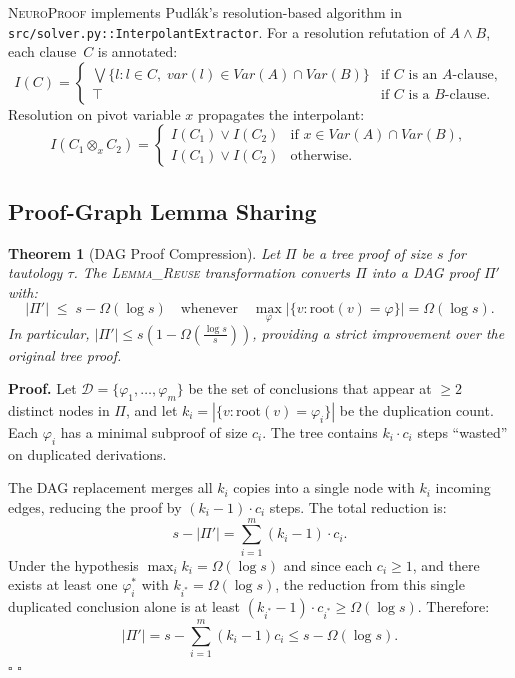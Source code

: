 \documentclass[conference]{IEEEtran}
\newtheorem{theorem}{Theorem}[section]
\newenvironment{proof}[1][Proof]{\textbf{#1.} }{\hfill$\square$}
\newcommand{\dlor}{\mathbin{\vee}}
\newcommand{\dltop}{\top}
\newcommand{\NP}{\textsc{NeuroProof}}
\begin{document}
\NP{} implements Pudl\'{a}k's resolution-based algorithm in
\texttt{src/solver.py::InterpolantExtractor}.  For a resolution
refutation of $A \wedge B$, each clause~$C$ is annotated:
\begin{equation}
  I(C) = \begin{cases}
    \bigvee\{l : l \in C,\;
      \mathit{var}(l) \in \mathit{Var}(A) \cap \mathit{Var}(B)\}
      & \text{if } C \text{ is an $A$-clause}, \\
    \dltop & \text{if } C \text{ is a $B$-clause}.
  \end{cases}
\end{equation}
Resolution on pivot variable $x$ propagates the interpolant:
\begin{equation}
  I(C_1 \otimes_x C_2) =
  \begin{cases}
    I(C_1) \dlor I(C_2)
      & \text{if } x \in \mathit{Var}(A) \cap \mathit{Var}(B), \\
    I(C_1) \dlor I(C_2)
      & \text{otherwise}.
  \end{cases}
\end{equation}

\subsection{Proof-Graph Lemma Sharing}

\begin{theorem}[DAG Proof Compression]
  \label{thm:proof-size}
  Let $\Pi$ be a tree proof of size $s$ for tautology $\tau$.
  The \textsc{Lemma\_Reuse} transformation converts $\Pi$ into a
  DAG proof $\Pi'$ with:
  \begin{equation}
    |\Pi'| \;\leq\;
    s - \Omega(\log s)
    \quad\text{whenever}\quad
    \max_{\varphi} |\{v : \mathrm{root}(v) = \varphi\}|
    = \Omega(\log s).
  \end{equation}
  In particular, $|\Pi'| \leq s(1 - \Omega(\tfrac{\log s}{s}))$,
  providing a \emph{strict} improvement over the original tree proof.
\end{theorem}
\begin{proof}
  Let $\mathcal{D} = \{\varphi_1, \ldots, \varphi_m\}$ be the set
  of conclusions that appear at $\geq 2$ distinct nodes in $\Pi$,
  and let $k_i = |\{v : \mathrm{root}(v) = \varphi_i\}|$ be the
  duplication count.  Each $\varphi_i$ has a minimal subproof of
  size $c_i$.  The tree contains $k_i \cdot c_i$ steps
  ``wasted'' on duplicated derivations.

  The DAG replacement merges all $k_i$ copies into a single node with
  $k_i$ incoming edges, reducing the proof by $(k_i - 1) \cdot c_i$
  steps.  The total reduction is:
  \[
    s - |\Pi'| = \sum_{i=1}^{m} (k_i - 1) \cdot c_i.
  \]
  Under the hypothesis $\max_i k_i = \Omega(\log s)$ and since each
  $c_i \geq 1$, and there exists at least one $\varphi_i^*$ with
  $k_{i^*} = \Omega(\log s)$, the reduction from this single
  duplicated conclusion alone is at least
  $(k_{i^*} - 1) \cdot c_{i^*} \geq \Omega(\log s)$.
  Therefore:
  \[
    |\Pi'| = s - \sum_{i=1}^{m}(k_i - 1) c_i
           \leq s - \Omega(\log s).
  \]
  \hfill$\square$
\end{proof}
\end{document}
